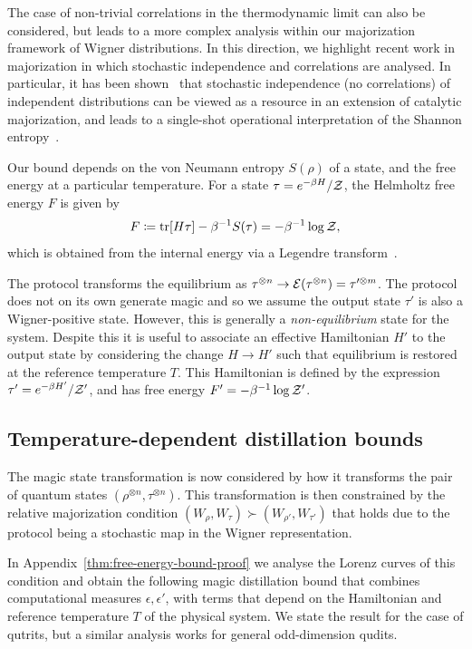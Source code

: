 \documentclass[pra,
aps,
twocolumn,
superscriptaddress,
groupedaddress,
nofootinbib,
reprint
]{revtex4-1}
\begin{document}
The case of non-trivial correlations in the thermodynamic limit can also be considered, but leads to a more complex analysis within our majorization framework of Wigner distributions. In this direction, we highlight recent work in majorization in which stochastic independence and correlations are analysed. In particular, it has been shown~\cite{muller_2015} that stochastic independence (no correlations) of independent distributions can be viewed as a resource in an extension of catalytic majorization, and leads to a single-shot operational interpretation of the Shannon entropy~\cite{muller_2016, muller_2019}.

Our bound depends on the von Neumann entropy $S(\rho)$ of a state, and the free energy at a particular temperature.
For a state $\tau = e^{-\beta H}/\mathcal{Z}$, the Helmholtz free energy $F$ is given by
\begin{equation}
	F \coloneqq \mbox{tr}[H \tau] - \beta^{-1}S(\tau) = -\beta^{-1}\log \mathcal{Z},
\end{equation}
which is obtained from the internal energy via a Legendre transform~\cite{Pathria_1997}.

The protocol transforms the equilibrium as $\tau^{\otimes n} \rightarrow {\mathcal E}(\tau^{\otimes n}) = \tau^{\prime \otimes m}$.  The protocol does not on its own generate magic and so we assume the output state $\tau'$ is also a Wigner-positive state. However, this is generally a \emph{non-equilibrium} state for the system. Despite this it is useful to associate an effective Hamiltonian $H'$ to the output state by considering the change $H \rightarrow H'$ such that equilibrium is restored at the reference temperature $T$. This Hamiltonian is defined by the expression $\tau' = e^{-\beta H'}/\mathcal{Z}'$, and has free energy $F' = -\beta^{-1} \log \mathcal{Z}'$. 

\subsection{Temperature-dependent distillation bounds}

The magic state transformation is now considered by how it transforms the pair of quantum states $(\rho^{\otimes n}, \tau^{\otimes n})$. This transformation is then constrained by the relative majorization condition $(W_{\rho}, W_\tau) \succ (W_{\rho'}, W_{\tau'})$ that holds due to the protocol being a stochastic map in the Wigner representation.

In Appendix~\ref{thm:free-energy-bound-proof} we analyse the Lorenz curves of this condition and obtain the following magic distillation bound that combines computational measures $\epsilon,\epsilon'$, with terms that depend on the Hamiltonian and reference temperature $T$ of the physical system. We state the result for the case of qutrits, but a similar analysis works for general odd-dimension qudits.
\end{document}
